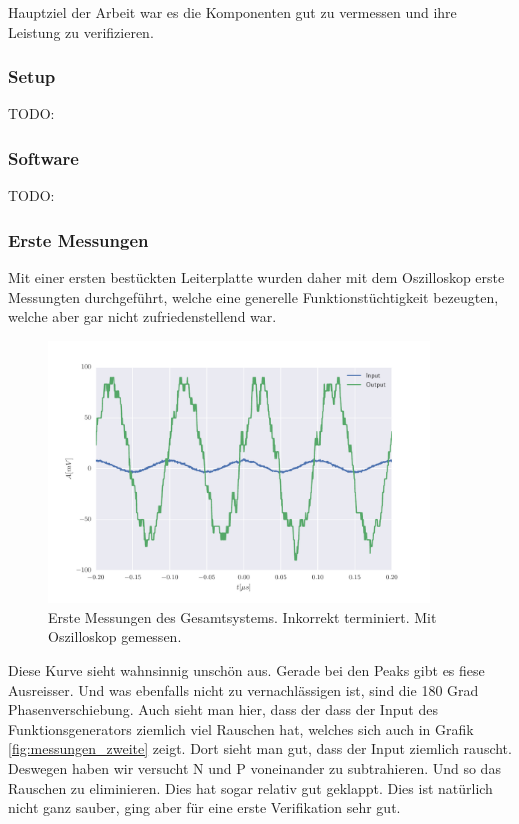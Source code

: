 
Hauptziel der Arbeit war es die Komponenten gut zu vermessen und ihre Leistung zu verifizieren.

\subsubsection*{Setup}
TODO:

\subsubsection*{Software}
TODO:

\subsubsection*{Erste Messungen}

Mit einer ersten bestückten Leiterplatte wurden daher mit dem Oszilloskop erste Messungten durchgeführt, welche eine generelle Funktionstüchtigkeit bezeugten, welche aber gar nicht zufriedenstellend war.

\begin{figure}[H]
\begin{center}
    \includegraphics[width=0.9\textwidth]{data/images/messungen/erste_messung}
    \caption{Erste Messungen des Gesamtsystems. Inkorrekt terminiert. Mit Oszilloskop gemessen.}
    \label{fig:messungen_erste}
\end{center}
\end{figure}

Diese Kurve sieht wahnsinnig unschön aus. Gerade bei den Peaks gibt es fiese Ausreisser. Und was ebenfalls nicht zu vernachlässigen ist, sind die 180 Grad Phasenverschiebung.
Auch sieht man hier, dass der dass der Input des Funktionsgenerators ziemlich viel Rauschen hat, welches sich auch in Grafik \ref{fig:messungen_zweite} zeigt.
Dort sieht man gut, dass der Input ziemlich rauscht. Deswegen haben wir versucht N und P voneinander zu subtrahieren. Und so das Rauschen zu eliminieren. Dies hat sogar relativ gut geklappt. Dies ist natürlich nicht ganz sauber, ging aber für eine erste Verifikation sehr gut.

